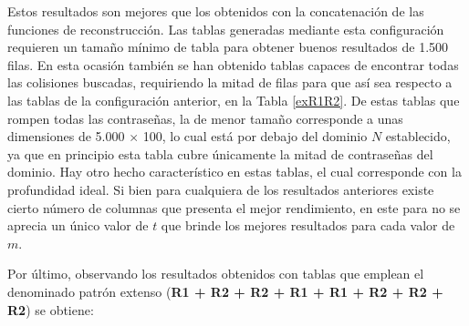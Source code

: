 \documentclass[12pt,spanish,listoffigures,listoftables,listofalgorithms]{tfgetsinf}
\begin{document}
Estos resultados son mejores que los obtenidos con la concatenación de las funciones de reconstrucción. Las tablas generadas mediante esta configuración requieren un tamaño mínimo de tabla para obtener buenos resultados de 1.500 filas. En esta ocasión también se han obtenido tablas capaces de encontrar todas las colisiones buscadas, requiriendo la mitad de filas para que así sea respecto a las tablas de la configuración anterior, en la Tabla \ref{exR1R2}. De estas tablas que rompen todas las contraseñas, la de menor tamaño corresponde a unas dimensiones de 5.000 $\times$ 100, lo cual está por debajo del dominio $N$ establecido, ya que en principio esta tabla cubre únicamente la mitad de contraseñas del dominio. Hay otro hecho característico en estas tablas, el cual corresponde con la profundidad ideal. Si bien para cualquiera de los resultados anteriores existe cierto número de columnas que presenta el mejor rendimiento, en este para no se aprecia un único valor de $t$ que brinde los mejores resultados para cada valor de $m$.

Por último, observando los resultados obtenidos con tablas que emplean el denominado patrón extenso (\textbf{R1 + R2 + R2 + R1 + R1 + R2 + R2 + R2}) se obtiene:
\end{document}
